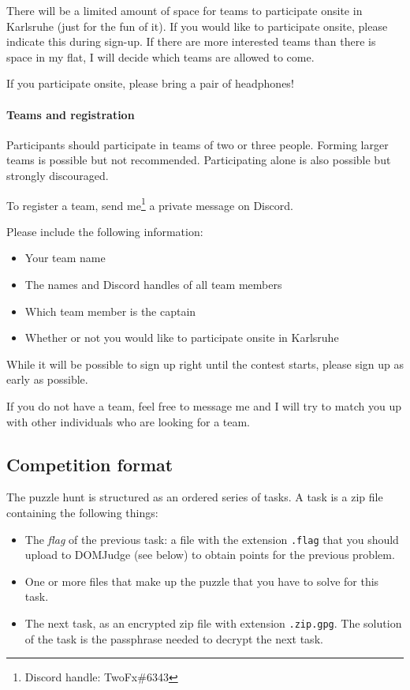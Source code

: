 \documentclass[fontsize=10pt,a4paper,DIV=12,parskip=half]{scrarticle}
\begin{document}
There will be a limited amount of space for teams to participate onsite in Karlsruhe (just for the fun of it).
If you would like to participate onsite, please indicate this during sign-up. If
there are more interested teams than there is space in my flat, I will decide which
teams are allowed to come.

If you participate onsite, please bring a pair of headphones!

\paragraph{Teams and registration}

Participants should participate in teams of two or three people. Forming larger
teams is possible but not recommended. Participating alone is also possible but
strongly discouraged.

To register a team, send me\footnote{Discord handle: TwoFx\#6343} a private
message on Discord.

Please include the following information:
\begin{itemize}
	\item Your team name
	\item The names and Discord handles of all team members
	\item Which team member is the captain
	\item Whether or not you would like to participate onsite in Karlsruhe
\end{itemize}

While it will be possible to sign up right until the contest starts, please
sign up as early as possible.

If you do not have a team, feel free to message me and I will try to match you up
with other individuals who are looking for a team.

\subsection*{Competition format}
The puzzle hunt is structured as an ordered series of tasks. A task is a
zip file containing the following things:
\begin{itemize}
	\item The \textit{flag} of the previous task: a file with the extension
		\texttt{.flag} that you should upload to DOMJudge (see below) to obtain
		points for the previous problem.
	\item One or more files that make up the puzzle that you have to solve for this
		task.
	\item The next task, as an encrypted zip file with extension \texttt{.zip.gpg}.
		The solution of the task is the passphrase needed to decrypt the next task.
\end{itemize}
\end{document}
